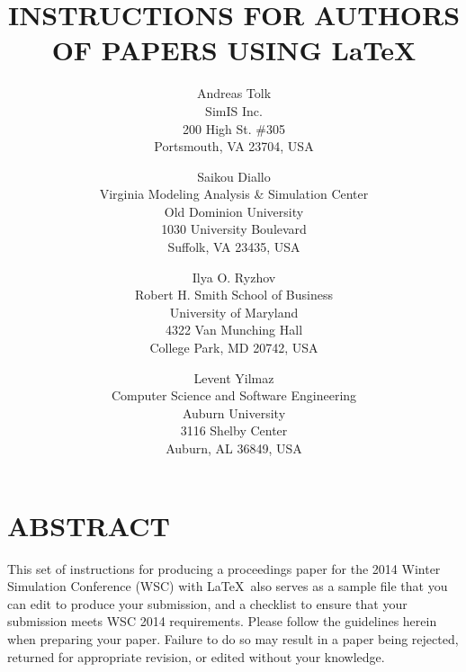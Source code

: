 \documentclass{wscpaperproc}
\theoremstyle{wsc}
\begin{document}
%
%

\title{INSTRUCTIONS FOR AUTHORS OF PAPERS USING \LaTeX}

\author{Andreas Tolk\\ [12pt]
SimIS Inc.\\
200 High St. \#305\\
Portsmouth, VA 23704, USA\\
\and
Saikou Diallo \\[12pt]
Virginia Modeling Analysis \& Simulation Center \\
Old Dominion University\\
1030 University Boulevard\\
Suffolk, VA 23435, USA \\
\and
Ilya O. Ryzhov\\ [12pt]
Robert H. Smith School of Business\\
University of Maryland\\
4322 Van Munching Hall\\
College Park, MD 20742, USA\\
\and
Levent Yilmaz\\ [12pt]
Computer Science and Software Engineering\\
Auburn University\\
3116 Shelby Center\\
Auburn, AL 36849, USA
}






\maketitle

\section*{ABSTRACT}
This set of instructions for producing a proceedings paper for the 2014
Winter Simulation Conference (WSC) with \LaTeX\ also serves as a sample file that you can edit to
produce your submission, and a checklist to ensure that your submission
meets WSC 2014 requirements. Please follow the guidelines herein when preparing your
paper. Failure to do so may result in a paper being rejected, returned for
appropriate revision, or edited without your knowledge.
\end{document}

